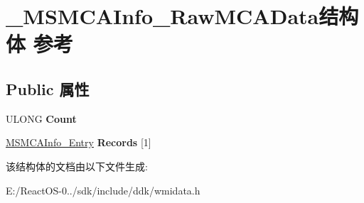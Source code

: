\hypertarget{struct___m_s_m_c_a_info___raw_m_c_a_data}{}\section{\+\_\+\+M\+S\+M\+C\+A\+Info\+\_\+\+Raw\+M\+C\+A\+Data结构体 参考}
\label{struct___m_s_m_c_a_info___raw_m_c_a_data}
\subsection*{Public 属性}
\begin{DoxyCompactItemize}
\item 
\mbox{\label{struct___m_s_m_c_a_info___raw_m_c_a_data_a8b3b21bc8eb4a2829c94532887a63fa6}} 
U\+L\+O\+NG {\bfseries Count}
\item 
\mbox{\label{struct___m_s_m_c_a_info___raw_m_c_a_data_a641206c17e9eae99f6cec48689488e3b}} 
\hyperlink{struct___m_s_m_c_a_info___entry}{M\+S\+M\+C\+A\+Info\+\_\+\+Entry} {\bfseries Records} \mbox{[}1\mbox{]}
\end{DoxyCompactItemize}


该结构体的文档由以下文件生成\+:\begin{DoxyCompactItemize}
\item 
E\+:/\+React\+O\+S-\/0../sdk/include/ddk/wmidata.\+h\end{DoxyCompactItemize}
